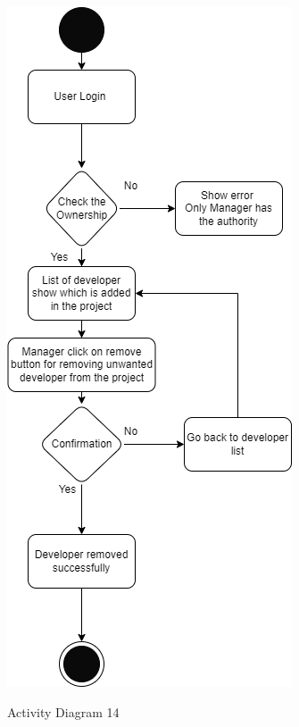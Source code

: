 \begin{figure}[H]
    \centering
    \caption{Activity Diagram 14}
    \includegraphics[scale=0.5]{./diagrams/Activity Diagram/ad-14.png}
    \label{fig:act-14}

\end{figure}


